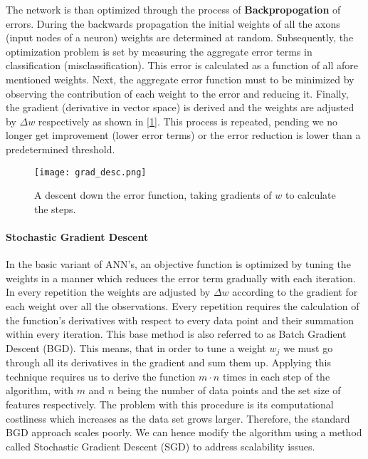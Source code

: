 		\par
		
		The network is than optimized through the process of \textbf{Backpropogation} of errors. During the backwards propagation the initial weights of all the axons (input nodes of a neuron) weights are determined at random. Subsequently, the optimization problem is set by measuring the aggregate error terms in classification (misclassification). This error is calculated as a function of all afore mentioned weights. Next, the aggregate error function must to be minimized by observing the contribution of each weight to the error and reducing it. Finally, the gradient (derivative in vector space) is derived and the weights are adjusted by $ \Delta w $ respectively as shown in [\ref{ANN_backprop}]. This process is repeated, pending we no longer get improvement (lower error terms) or the error reduction is lower than a predetermined threshold.
		
		\begin{figure}[h]
			\centering
			\captionsetup{width=0.8\textwidth}
			\texttt{[image: grad\_desc.png]}
			\caption[ANN Gradient Descent]{
				\footnotesize{
					A descent down the error function, taking gradients of $ w $ to calculate the steps.
				}
			} 
			\label{ANN_backprop}
		\end{figure}
	
	\paragraph{Stochastic Gradient Descent}
		In the basic variant of ANN's, an objective function is optimized by tuning the weights in a manner which reduces the error term gradually with each iteration. In every repetition the weights are adjusted by $ \Delta w $ according to the gradient for each weight over all the observations. Every repetition  requires the calculation of the function's derivatives with respect to every data point and their summation within every iteration. This base method is also referred to as Batch Gradient Descent (BGD). This means, that in order to tune a weight $ w_j $ we must go through all its derivatives in the gradient and sum them up.  Applying this technique requires us to derive the function $ m \cdot n $ times in each step of the algorithm, with $ m $ and $ n $ being the number of data points and the set size of features respectively. The problem with this procedure is its computational costliness which increases as the data set grows larger. Therefore, the standard BGD approach scales poorly. We can hence modify the algorithm using a method called Stochastic Gradient Descent (SGD) to address scalability issues.
		
